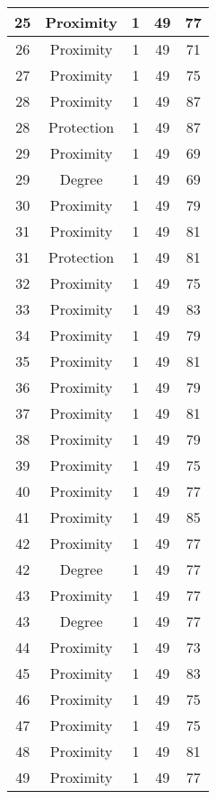 \documentclass[results.tex]{subfiles}
\begin{document}
\begin{center}
\begin{tabular}{| c || c | c | c | c |}
    \hline
    25 & Proximity & 1 & 49 & 77 \\ 
    \hline
    26 & Proximity & 1 & 49 & 71 \\ 
    \hline
    27 & Proximity & 1 & 49 & 75 \\ 
    \hline
    28 & Proximity & 1 & 49 & 87 \\ 
    \hline
    28 & Protection & 1 & 49 & 87 \\ 
    \hline
    29 & Proximity & 1 & 49 & 69 \\ 
    \hline
    29 & Degree & 1 & 49 & 69 \\ 
    \hline
    30 & Proximity & 1 & 49 & 79 \\ 
    \hline
    31 & Proximity & 1 & 49 & 81 \\ 
    \hline
    31 & Protection & 1 & 49 & 81 \\ 
    \hline
    32 & Proximity & 1 & 49 & 75 \\ 
    \hline
    33 & Proximity & 1 & 49 & 83 \\ 
    \hline
    34 & Proximity & 1 & 49 & 79 \\ 
    \hline
    35 & Proximity & 1 & 49 & 81 \\ 
    \hline
    36 & Proximity & 1 & 49 & 79 \\ 
    \hline
    37 & Proximity & 1 & 49 & 81 \\ 
    \hline
    38 & Proximity & 1 & 49 & 79 \\ 
    \hline
    39 & Proximity & 1 & 49 & 75 \\ 
    \hline
    40 & Proximity & 1 & 49 & 77 \\ 
    \hline
    41 & Proximity & 1 & 49 & 85 \\ 
    \hline
    42 & Proximity & 1 & 49 & 77 \\ 
    \hline
    42 & Degree & 1 & 49 & 77 \\ 
    \hline
    43 & Proximity & 1 & 49 & 77 \\ 
    \hline
    43 & Degree & 1 & 49 & 77 \\ 
    \hline
    44 & Proximity & 1 & 49 & 73 \\ 
    \hline
    45 & Proximity & 1 & 49 & 83 \\ 
    \hline
    46 & Proximity & 1 & 49 & 75 \\ 
    \hline
    47 & Proximity & 1 & 49 & 75 \\ 
    \hline
    48 & Proximity & 1 & 49 & 81 \\ 
    \hline
    49 & Proximity & 1 & 49 & 77 \\ 
    \hline   \end{tabular}
\end{center}
\end{document}

